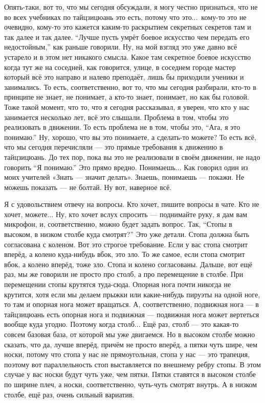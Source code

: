 Опять-таки, вот то, что мы сегодня обсуждали, я могу честно признаться, что не во всех
учебниках по тайцзицюань это есть, потому что это...\ кому-то это не очевидно, кому-то это кажется
каким-то раскрытием секретных секретов там и так далее и так далее. ``Лучше пусть умрёт боевое
искусство чем передать его недостойным,'' как раньше говорили. Ну, на мой взгляд это уже давно всё
устарело и в этом нет никакого смысла. Какое там секретное боевое искусство когда тут же на
соседней, как говорится, улице, в соседнем городе мастер который всё это направо и налево
преподаёт, лишь
бы приходили ученики и занимались. То есть, соответственно, вот то, что мы сегодня разбирали,
кто-то в принципе не знает, не понимает, а кто-то знает, понимает, но как бы головой. Тоже
такой момент, что то, что я сегодня рассказывал, я уверен, что кто у нас занимается несколько
лет, всё это слышали. Проблема в том, чтобы это реализовать в движении. То есть проблема не в
том, чтобы это, ``Ага, я это понимаю.'' Ну, хорошо, что вы это понимаете, а сделать-то можете? То
есть всё, что мы сегодня перечисляли --- это прямые требования к движению в тайцзицюань. До тех
пор, пока вы это
не реализовали в своём движении, не надо говорить ``Я понимаю.'' Это прямо вредно. Понимаешь...
Как говорил один из моих учителей «Знать --- значит делать». Знаешь, понимаешь --- покажи.
Не можешь показать --- не болтай. Ну вот, наверное всё.

Я с удовольствием отвечу на вопросы. Кто хочет,
пишите вопросы в чате. Кто не хочет, можете... Ну, кто хочет вслух спросить --- поднимайте руку, я
дам вам микрофон, и, соответственно, можно будет задать вопрос. Так, ``Стопы в высоком, в низком
столбе куда смотрят?'' Это уже детали. Стопа должна быть согласована с коленом. Вот это строгое
требование. Если у вас стопа смотрит вперёд, а колено куда-нибудь вбок, это зло. То же самое,
если стопа смотрит вбок, а колено вперёд, тоже зло. Стопа и колено согласованы. Дальше, вот
ещё раз, мы же говорили не просто про столб, а про перемещение в столбе. При перемещении стопы
крутятся туда-сюда. Опорная нога почти никогда не крутится, хотя если мы делаем прыжки или
какие-нибудь пируэты на одной ноге, то там и опорная нога может вращаться. А, соответственно,
подвижная нога --- в тайцзицюань есть опорная нога и подвижная --- подвижная нога может вертеться
вообще куда угодно. Поэтому когда столб... Ещё раз, столб --- это какая-то совсем базовая база, от
которой
мы уже двигаемся. Но в высоком столбе можно сказать, что да, лучше вперёд, причём не просто
вперёд, а пятки чуть шире, чем носки, потому что стопа у нас не прямоугольная, стопа у нас --- это
трапеция, поэтому вот параллельность стоп выставляется по внешнему ребру стопы. В этом случае
у вас носки будут чуть уже, чем пятки. Пятки ставятся в высоком столбе по ширине плеч, а
носки, соответственно, чуть-чуть смотрят внутрь. А в низком столбе, ещё раз, очень сильный
вариатив.


